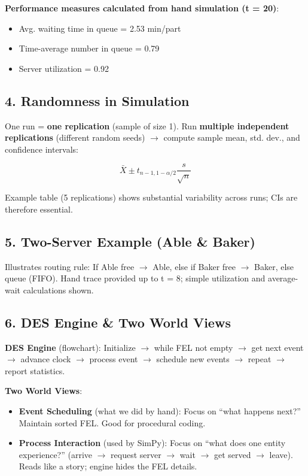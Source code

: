 \documentclass[11pt]{article}
\begin{document}
\textbf{Performance measures calculated from hand simulation (t = 20)}:
\begin{itemize}[leftmargin=*]
\item Avg. waiting time in queue = 2.53 min/part  
\item Time-average number in queue = 0.79  
\item Server utilization = 0.92  
\end{itemize}

\subsection*{4. Randomness in Simulation}
One run = \textbf{one replication} (sample of size 1).  
Run \textbf{multiple independent replications} (different random seeds) $\rightarrow$ compute sample mean, std. dev., and confidence intervals:

\[
\bar{X} \pm t_{n-1,1-\alpha/2} \frac{s}{\sqrt{n}}
\]

Example table (5 replications) shows substantial variability across runs; CIs are therefore essential.

\subsection*{5. Two-Server Example (Able \& Baker)}
Illustrates routing rule:  
If Able free $\rightarrow$ Able, else if Baker free $\rightarrow$ Baker, else queue (FIFO).  
Hand trace provided up to t = 8; simple utilization and average-wait calculations shown.

\subsection*{6. DES Engine \& Two World Views}
\textbf{DES Engine} (flowchart): Initialize $\rightarrow$ while FEL not empty $\rightarrow$ get next event $\rightarrow$ advance clock $\rightarrow$ process event $\rightarrow$ schedule new events $\rightarrow$ repeat $\rightarrow$ report statistics.

\textbf{Two World Views}:
\begin{itemize}[leftmargin=*]
\item \textbf{Event Scheduling} (what we did by hand): Focus on ``what happens next?'' Maintain sorted FEL. Good for procedural coding.
\item \textbf{Process Interaction} (used by SimPy): Focus on ``what does one entity experience?'' (arrive $\rightarrow$ request server $\rightarrow$ wait $\rightarrow$ get served $\rightarrow$ leave). Reads like a story; engine hides the FEL details.
\end{itemize}
\end{document}
